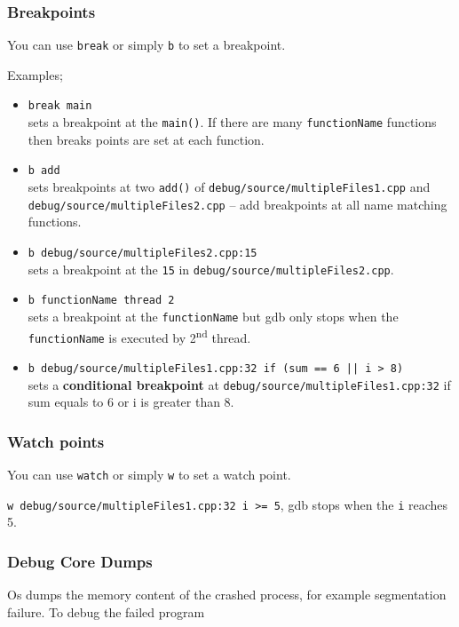 \subsubsection{Breakpoints}
You can use \texttt{break} or simply \texttt{b} to set a breakpoint.

Examples;
\begin{itemize}
  \item \texttt{break main} \\ 
    sets a breakpoint at the \texttt{main()}. If there are many \texttt{functionName} functions then breaks points are set at each function.

  \item \texttt{b add} \\
    sets breakpoints at two \texttt{add()} of \texttt{debug/source/multipleFiles1.cpp} and \texttt{debug/source/multipleFiles2.cpp} -- add breakpoints at all name matching functions.

  \item \texttt{b debug/source/multipleFiles2.cpp:15} \\
    sets a breakpoint at the \texttt{15} in \texttt{debug/source/multipleFiles2.cpp}.

  \item \texttt{b functionName thread 2} \\
    sets a breakpoint at the \texttt{functionName} but gdb only stops when the \texttt{functionName} is executed by 2\textsuperscript{nd} thread.
  \item \texttt{b debug/source/multipleFiles1.cpp:32 if (sum == 6 || i > 8)} \\
    sets a \textbf{conditional breakpoint} at \texttt{debug/source/multipleFiles1.cpp:32} if sum equals to 6 or i is greater than 8.
\end{itemize}






\subsubsection{Watch points}
You can use \texttt{watch} or simply \texttt{w} to set a watch point.


\texttt{w debug/source/multipleFiles1.cpp:32 i >= 5}, gdb stops when the \texttt{i} reaches 5.


\subsubsection{Debug Core Dumps}
Os dumps the memory content of the crashed process, for example segmentation failure.
To debug the failed program

